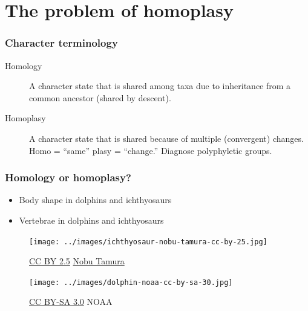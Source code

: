 \section{The problem of homoplasy}

\begin{frame}
    \frametitle{Character terminology}
    \begin{description}
        \item[Homology] A character state that is shared among taxa due to
            inheritance from a common ancestor (shared by descent).
        \item[Homoplasy] A character state that is shared because of multiple
            (convergent) changes. Homo = ``same'' plasy = ``change.'' Diagnose
            polyphyletic groups.
    \end{description}
\end{frame}

\begin{frame}
    \frametitle{Homology or homoplasy?}
    \begin{itemize}
        \item<1-> Body shape in dolphins and ichthyosaurs
        \item<1-> Vertebrae in dolphins and ichthyosaurs
    \end{itemize}
    \begin{figure}
        \texttt{[image: ../images/ichthyosaur-nobu-tamura-cc-by-25.jpg]}
        \caption{\tiny \href{http://creativecommons.org/licenses/by/2.5/}{CC BY 2.5} \href{http://spinops.blogspot.com/}{Nobu Tamura}}
    \end{figure}
    \vspace{-0.7cm}
    \begin{figure}
        \texttt{[image: ../images/dolphin-noaa-cc-by-sa-30.jpg]}
        \caption{\tiny \href{http://creativecommons.org/licenses/by-sa/3.0/}{CC BY-SA 3.0} NOAA}
    \end{figure}
\end{frame}

